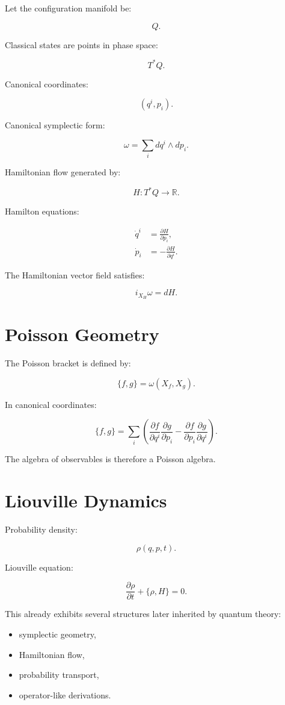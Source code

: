 \documentclass[11pt]{book}
\begin{document}
Let the configuration manifold be:

\[
Q.
\]

Classical states are points in phase space:

\[
T^*Q.
\]

Canonical coordinates:

\[
(q^i,p_i).
\]

Canonical symplectic form:

\[
\omega
=
\sum_i dq^i \wedge dp_i.
\]

Hamiltonian flow generated by:

\[
H:T^*Q\to\mathbb R.
\]

Hamilton equations:

\begin{align}
\dot q^i &= \frac{\partial H}{\partial p_i},\\
\dot p_i &= -\frac{\partial H}{\partial q^i}.
\end{align}

The Hamiltonian vector field satisfies:

\[
i_{X_H}\omega = dH.
\]

\section{Poisson Geometry}

The Poisson bracket is defined by:

\[
\{f,g\}
=
\omega(X_f,X_g).
\]

In canonical coordinates:

\[
\{f,g\}
=
\sum_i
\left(
\frac{\partial f}{\partial q^i}
\frac{\partial g}{\partial p_i}
-
\frac{\partial f}{\partial p_i}
\frac{\partial g}{\partial q^i}
\right).
\]

The algebra of observables is therefore a Poisson algebra.

\section{Liouville Dynamics}

Probability density:

\[
\rho(q,p,t).
\]

Liouville equation:

\[
\frac{\partial \rho}{\partial t}
+
\{\rho,H\}
=0.
\]

This already exhibits several structures later inherited by quantum theory:

\begin{itemize}
\item symplectic geometry,
\item Hamiltonian flow,
\item probability transport,
\item operator-like derivations.
\end{itemize}
\end{document}
